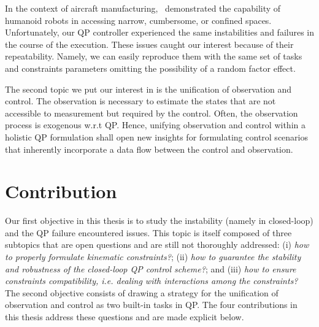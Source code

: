 In the context of aircraft manufacturing,~\cite{kheddar2019ram} demonstrated the capability of humanoid robots in accessing narrow, cumbersome, or confined spaces. Unfortunately, our QP controller experienced the same instabilities and failures in the course of the execution. These issues caught our interest because of their repeatability. Namely, we can easily reproduce them with the same set of tasks and constraints parameters omitting the possibility of a random factor effect. %

The second topic we put our interest in is the unification of observation and control. The observation is necessary to estimate the states that are not accessible to measurement but required by the control. Often, the observation process is exogenous w.r.t QP. Hence, unifying observation and control within a holistic QP formulation shall open new insights for formulating control scenarios that inherently incorporate a data flow between the control and observation. %
\section*{Contribution}
Our first objective in this thesis is to study the instability (namely in closed-loop) and the QP failure encountered issues. This topic is itself composed of three subtopics that are open questions and are still not thoroughly addressed: (i) \emph{how to properly formulate kinematic constraints?}; (ii) \emph{how to guarantee the stability and robustness of the closed-loop QP control scheme?}; and (iii) \emph{how to ensure constraints compatibility, i.e. dealing with interactions among the constraints?} 
The second objective consists of drawing a strategy for the unification of observation and control as two built-in tasks in QP. The four contributions in this thesis address these questions and are made explicit below.

